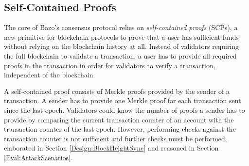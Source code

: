 \subsection{Self-Contained Proofs}
\label{Design:SelfContainedProofs}

The core of Bazo's consensus protocol relies on \textit{self-contained proofs} (SCPs), a new primitive for blockchain protocols to prove that a user has sufficient funds without relying on the blockchain history at all.
Instead of validators requiring the full blockchain to validate a transaction, a user has to provide all required proofs in the transaction in order for validators to verify a transaction, independent of the blockchain.
 
A self-contained proof consists of Merkle proofs provided by the sender of a transaction. A sender has to provide one Merkle proof for each transaction sent since the last epoch. %
Validators could know the number of proofs a sender has to provide by comparing the current transaction counter of an account with the transaction counter of the last epoch. However, performing checks against the transaction counter is not sufficient and further checks must be performed, elaborated in Section \ref{Design:BlockHeightSync} and reasoned in Section \ref{Eval:AttackScenarios}.

